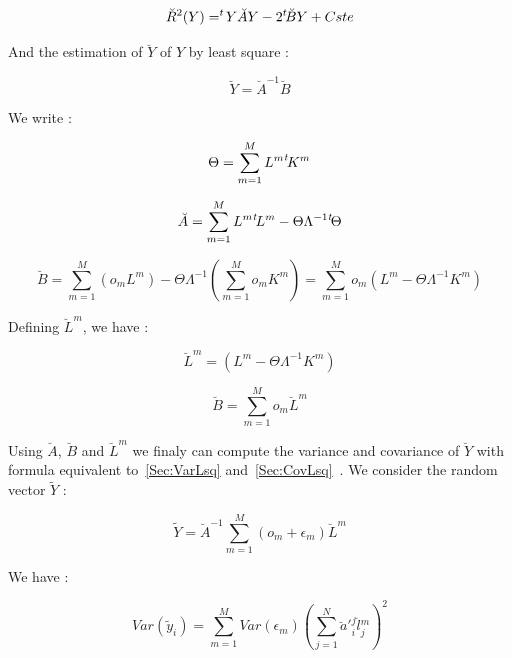 \begin{equation}  
      \breve{R}^2 (Y) = ^{t} \! Y \breve{A} Y - 2  ^{t} \! \breve{B}  Y + Cste
\end{equation}


And the estimation of $\breve{Y}$ of $Y$ by least square : 


\begin{equation}  
      \breve{Y} =  \breve{A}^{-1}  \breve{B}
\end{equation}

We write :

\begin{equation}  
     \Theta =  \sum\limits_{m=1}^M {L^m} ^{t} \! {K^m}   
\end{equation}  


\begin{equation}  
     \breve{A} =  \sum\limits_{m=1}^M{L^m}{^{t} \! {L^m}} - \Theta \Lambda^{-1}   {^{t} \!} \Theta 
     \label{FinalBreveA}
\end{equation}  

\begin{equation}  
     \breve{B}  =   \sum\limits_{m=1}^M (o_m L^m ) 
                - \Theta \Lambda^{-1}  (\sum\limits_{m=1}^M o_m K^m )
               = \sum\limits_{m=1}^M  o_m (L^m -\Theta \Lambda^{-1} K^m)
     \label{FinalBreveB}
\end{equation}  

Defining $\breve{L}^m$, we have :

\begin{equation}  
     \breve{L}^m   =   (L^m  - \Theta  \Lambda^{-1} K^m)
\end{equation}  

\begin{equation}  
     \breve{B}  = \sum\limits_{m=1}^M  o_m \breve{L}^m
\end{equation}  


Using $\breve{A}$, $\breve{B}$  and $\breve{L}^m$ we finaly can compute the variance and
covariance of $\breve Y$ with formula equivalent to~\ref{Sec:VarLsq} and~\ref{Sec:CovLsq}~.
We consider the random vector $\tilde Y$ :

\begin{equation}  
     \tilde{Y}  =   \breve{A}^{-1}  \sum\limits_{m=1}^M  (o_m + \epsilon _m) \breve{L}^m
\end{equation}  

We have :

\begin{equation}
     Var(\tilde{y}_i) =  \sum\limits_{m=1}^M  Var(\epsilon _m)  (\sum\limits_{j=1}^N {\breve {a}'}{_i^j}  {\breve l}{^m_j})^2 
\label{Final:Var}
\end{equation}


